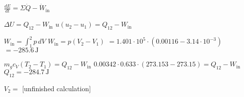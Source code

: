 \( \frac{dE}{dt} = \Sigma \dot{Q} - \dot{W}_{\text{in}} \)  

\( \Delta U = Q_{12} - W_{\text{in}} \)  
\( u (u_2 - u_1) = Q_{12} - W_{\text{in}} \)  

\( W_{\text{in}} = \int_{1}^{2} p \, dV \)  
\( W_{\text{in}} = p (V_2 - V_1) \)  
\( = 1.401 \cdot 10^5 \cdot (0.00116 - 3.14 \cdot 10^{-3}) \)  
\( = -285.6 \, \text{J} \)  

\( m_g c_V (T_2 - T_1) = Q_{12} - W_{\text{in}} \)  
\( 0.00342 \cdot 0.633 \cdot (273.153 - 273.15) = Q_{12} - W_{\text{in}} \)  
\( Q_{12} = -284.7 \, \text{J} \)  

\( V_2 = \) [unfinished calculation]